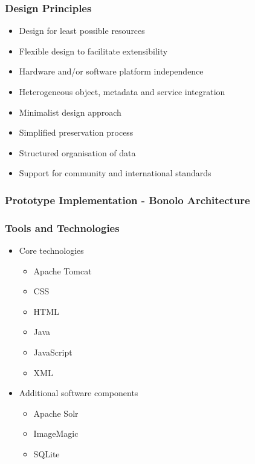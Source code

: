 \documentclass[xcolor=dvitex,t,11pt]{beamer}
\begin{document}
\begin{frame}[fragile]
\frametitle{Design Principles}
\begin{itemize}
\item Design for least possible resources
\item Flexible design to facilitate extensibility
\item Hardware and/or software platform independence
\item Heterogeneous object, metadata and service integration
\item Minimalist design approach
\item Simplified preservation process
\item Structured organisation of data
\item Support for community and international standards
\end{itemize}

\end{frame}


\begin{frame}[fragile]
\frametitle{Prototype Implementation - Bonolo Architecture}
\begin{figure}
\centering
\framebox[\textwidth]{%

}
\end{figure}
\end{frame}

\begin{frame}[fragile]
\frametitle{Tools and Technologies}
\begin{itemize}
\item Core technologies
\begin{itemize}
\item Apache Tomcat
\item CSS
\item HTML
\item Java
\item JavaScript
\item XML
\end{itemize}
\item Additional software components
\begin{itemize}
\item Apache Solr
\item ImageMagic
\item SQLite
\end{itemize}
\end{itemize}
\end{frame}
\end{document}
